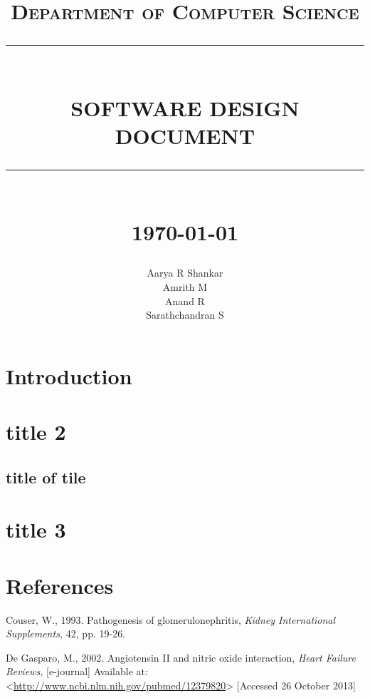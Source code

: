 \documentclass[12pt]{report}
\newcommand{\HRule}[1]{\rule{\linewidth}{#1}}
\begin{document}
\title{ \normalsize \textsc{Department of Computer Science}
		\\ [2.0cm]
		\HRule{0.5pt} \\
		\LARGE \textbf{\uppercase{Software Design Document}}
		\HRule{2pt} \\ [0.5cm]
		\normalsize \today \vspace*{5\baselineskip}}

\date{}

\author{
		Aarya R Shankar \\ 
		Amrith M \\
		Anand R \\
		Sarathchandran S }

\maketitle

\newpage

\sectionfont{\scshape}


\section*{Introduction}
\lipsum
\section*{title 2}
\lipsum
\subsection*{title of tile}

\section*{title 3}
\newpage
\section*{References}



Couser, W., 1993. Pathogenesis of glomerulonephritis, \textit{Kidney International Supplements,} 42, pp. 19-26.
\newline
\newline

De Gasparo, M., 2002. Angiotensin II and nitric oxide interaction, \textit{Heart Failure Reviews,} [e-journal] Available at:<\url{http://www.ncbi.nlm.nih.gov/pubmed/12379820}> [Accessed 26 October 2013]
\newline
\newline
\end{document}
